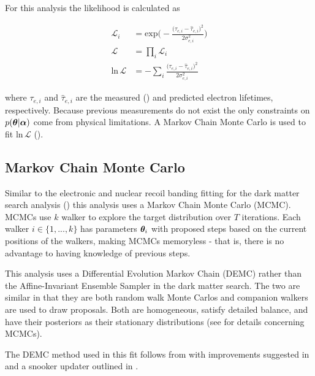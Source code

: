 For this analysis the likelihood is calculated as

\begin{subequations}
\begin{align}
\mathcal{L}_i &= \mathrm{exp} \bigg( -\frac{\big(\tau_{e, i} -
\hat{\tau}_{e, i} \big)^2}{2 \sigma_{e, i}^2} \bigg)
\\[3pt]
\mathcal{L} &= \prod_i \mathcal{L}_i
\\[3pt]
\mathrm{ln}\, \mathcal{L} &= -\sum_i \frac{\big(\tau_{e, i} -
\hat{\tau}_{e, i} \big)^2}{2\sigma_{e, i}^2}
\end{align}
\label{eq:elifetime_fit_mcmc_de_snooker_projs}
\end{subequations}

\noindent where $\tau_{e, i}$ and $\hat{\tau}_{e, i}$ are the measured () and predicted
electron lifetimes, respectively.  Because previous measurements do not exist the only constraints on $p(\boldsymbol{\theta}|\boldsymbol{\alpha})$
come from physical limitations.  A Markov Chain Monte Carlo is used to fit $\mathrm{ln}\, \mathcal{L}$
().



\subsection{Markov Chain Monte Carlo}
\label{subsec:elifetime_fit_mcmc}
Similar to the electronic and nuclear recoil banding fitting for the dark matter search analysis
() this analysis uses a Markov Chain Monte Carlo (MCMC).  MCMCs use $k$ walker
to explore the target distribution
over $T$ iterations.  Each walker $i \in \{1, ..., k\}$ has parameters $\boldsymbol{\theta}_i$ with proposed steps based on the current
positions of the
walkers, making MCMCs memoryless - that is, there is no advantage to having knowledge of previous steps.

This analysis uses a Differential Evolution Markov Chain (DEMC) rather than the Affine-Invariant Ensemble Sampler in the dark matter
search.  The two are similar in that they are both random walk Monte Carlos and companion walkers are used to draw proposals.  Both are
homogeneous, satisfy detailed balance, and have their posteriors as their stationary distributions (see
 for details concerning MCMCs).

The DEMC method used in this fit follows from
 with improvements suggested in  and a snooker updater outlined in .

